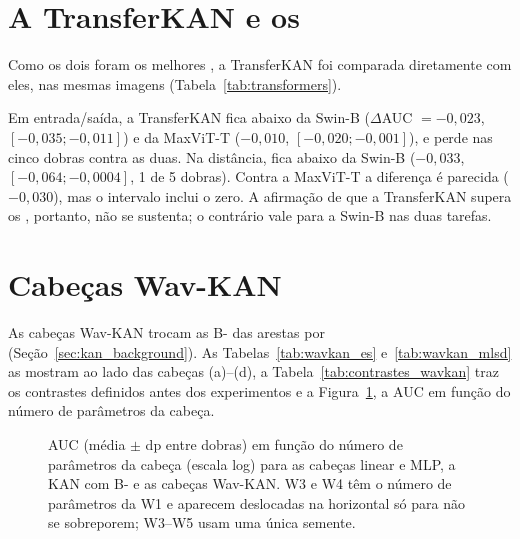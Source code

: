 \section{A TransferKAN e os \texorpdfstring{}{Transformers}}
\label{sec:res_transformers}

Como os dois  foram os melhores , a TransferKAN foi comparada diretamente com eles, nas mesmas imagens (Tabela~\ref{tab:transformers}).



Em entrada/saída, a TransferKAN fica abaixo da Swin-B ($\Delta$AUC $= -0{,}023$, $[-0{,}035; -0{,}011]$) e da MaxViT-T ($-0{,}010$, $[-0{,}020; -0{,}001]$), e perde nas cinco dobras contra as duas. Na distância, fica abaixo da Swin-B ($-0{,}033$, $[-0{,}064; -0{,}0004]$, 1 de 5 dobras). Contra a MaxViT-T a diferença é parecida ($-0{,}030$), mas o intervalo inclui o zero. A afirmação de que a TransferKAN supera os , portanto, não se sustenta; o contrário vale para a Swin-B nas duas tarefas.

\section{Cabeças Wav-KAN}
\label{sec:res_wavkan}

As cabeças Wav-KAN trocam as B- das arestas por  (Seção~\ref{sec:kan_background}). As Tabelas~\ref{tab:wavkan_es} e~\ref{tab:wavkan_mlsd} as mostram ao lado das cabeças (a)--(d), a Tabela~\ref{tab:contrastes_wavkan} traz os contrastes definidos antes dos experimentos e a Figura~\ref{fig:auc_parametros}, a AUC em função do número de parâmetros da cabeça.



\begin{figure}[!htbp]
\centering

\caption{AUC (média $\pm$ dp entre dobras) em função do número de parâmetros da cabeça (escala log) para as cabeças linear e MLP, a KAN com B- e as cabeças Wav-KAN. W3 e W4 têm o número de parâmetros da W1 e aparecem deslocadas na horizontal só para não se sobreporem; W3--W5 usam uma única semente.}
\label{fig:auc_parametros}
\end{figure}


